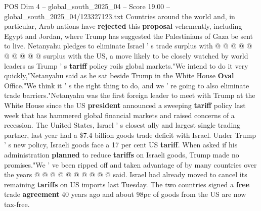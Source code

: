 \begin{textsample}{POS Dim 4 – global\_south\_2025\_04 – Score 19.00 – global\_south\_2025\_04/123327123.txt}
Countries around the world and, in particular, Arab nations have \textbf{rejected} this \textbf{proposal} vehemently, including Egypt and Jordan, where Trump has suggested the Palestinians of Gaza be sent to live.
Netanyahu pledges to eliminate Israel ' s trade surplus with @ @ @ @ @ @ @ @ @ @ surplus with the US, a move likely to be closely watched by world leaders as Trump ' s \textbf{tariff} policy roils global markets."We intend to do it very quickly,"Netanyahu said as he sat beside Trump in the White House \textbf{Oval} Office."We think it ' s the right thing to do, and we ' re going to also eliminate trade barriers."Netanyahu was the first foreign leader to meet with Trump at the White House since the US \textbf{president} announced a sweeping \textbf{tariff} policy last week that has hammered global financial markets and raised concerns of a recession.
The United States, Israel ' s closest ally and largest single trading partner, last year had a \$7.4 billion goods trade deficit with Israel.
Under Trump ' s new policy, Israeli goods face a 17 per cent US \textbf{tariff}.
When asked if his administration \textbf{planned} to reduce \textbf{tariffs} on Israeli goods, Trump made no promises."We ' ve been ripped off and taken advantage of by many countries over the years @ @ @ @ @ @ @ @ @ @ said.
Israel had already moved to cancel its remaining \textbf{tariffs} on US imports last Tuesday.
The two countries signed a \textbf{free} trade \textbf{agreement} 40 years ago and about 98pc of goods from the US are now tax-free.

\end{textsample}
